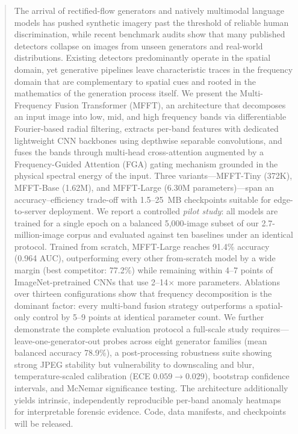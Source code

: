 \documentclass[journal]{IEEEtran}
\begin{document}
\begin{abstract}
The arrival of rectified-flow generators and natively multimodal language models has pushed synthetic imagery past the threshold of reliable human discrimination, while recent benchmark audits show that many published detectors collapse on images from unseen generators and real-world distributions. Existing detectors predominantly operate in the spatial domain, yet generative pipelines leave characteristic traces in the frequency domain that are complementary to spatial cues and rooted in the mathematics of the generation process itself. We present the Multi-Frequency Fusion Transformer (MFFT), an architecture that decomposes an input image into low, mid, and high frequency bands via differentiable Fourier-based radial filtering, extracts per-band features with dedicated lightweight CNN backbones using depthwise separable convolutions, and fuses the bands through multi-head cross-attention augmented by a Frequency-Guided Attention (FGA) gating mechanism grounded in the physical spectral energy of the input. Three variants---MFFT-Tiny (372K), MFFT-Base (1.62M), and MFFT-Large (6.30M parameters)---span an accuracy--efficiency trade-off with 1.5--25~MB checkpoints suitable for edge-to-server deployment. We report a controlled \emph{pilot study}: all models are trained for a single epoch on a balanced 5,000-image subset of our 2.7-million-image corpus and evaluated against ten baselines under an identical protocol. Trained from scratch, MFFT-Large reaches 91.4\% accuracy (0.964 AUC), outperforming every other from-scratch model by a wide margin (best competitor: 77.2\%) while remaining within 4--7 points of ImageNet-pretrained CNNs that use 2--14$\times$ more parameters. Ablations over thirteen configurations show that frequency decomposition is the dominant factor: every multi-band fusion strategy outperforms a spatial-only control by 5--9 points at identical parameter count. We further demonstrate the complete evaluation protocol a full-scale study requires---leave-one-generator-out probes across eight generator families (mean balanced accuracy 78.9\%), a post-processing robustness suite showing strong JPEG stability but vulnerability to downscaling and blur, temperature-scaled calibration (ECE $0.059 \rightarrow 0.029$), bootstrap confidence intervals, and McNemar significance testing. The architecture additionally yields intrinsic, independently reproducible per-band anomaly heatmaps for interpretable forensic evidence. Code, data manifests, and checkpoints will be released.
\end{abstract}
\end{document}

